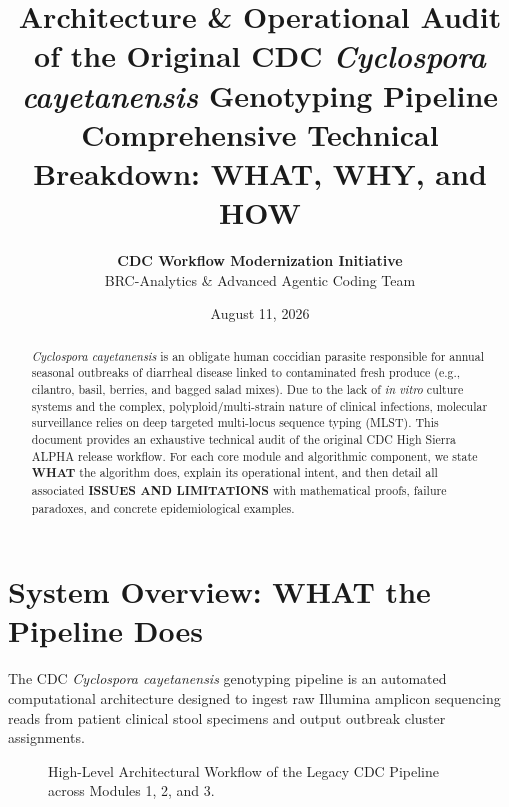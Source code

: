 \documentclass[11pt,a4paper]{article}
\title{\vspace{-1.5cm}\Huge \textbf{\color{CDCBlue} Architecture \& Operational Audit of the Original CDC \textit{Cyclospora cayetanensis} Genotyping Pipeline}\\[0.4em]
\Large \textbf{\color{SlateBlue} Comprehensive Technical Breakdown: WHAT, WHY, and HOW}}
\author{\textbf{CDC Workflow Modernization Initiative} \\ BRC-Analytics \& Advanced Agentic Coding Team}
\date{August 11, 2026}
\begin{document}
\maketitle

\begin{abstract}
\noindent \textit{Cyclospora cayetanensis} is an obligate human coccidian parasite responsible for annual seasonal outbreaks of diarrheal disease linked to contaminated fresh produce (e.g., cilantro, basil, berries, and bagged salad mixes). Due to the lack of \textit{in vitro} culture systems and the complex, polyploid/multi-strain nature of clinical infections, molecular surveillance relies on deep targeted multi-locus sequence typing (MLST). This document provides an exhaustive technical audit of the original CDC High Sierra ALPHA release workflow. For each core module and algorithmic component, we state \textbf{WHAT} the algorithm does, explain its operational intent, and then detail all associated \textbf{ISSUES AND LIMITATIONS} with mathematical proofs, failure paradoxes, and concrete epidemiological examples.
\end{abstract}

\section{System Overview: WHAT the Pipeline Does}

The CDC \textit{Cyclospora cayetanensis} genotyping pipeline is an automated computational architecture designed to ingest raw Illumina amplicon sequencing reads from patient clinical stool specimens and output outbreak cluster assignments.

\begin{figure}[h]
\centering
{}
\caption{High-Level Architectural Workflow of the Legacy CDC Pipeline across Modules 1, 2, and 3.}
\label{fig:arch}
\end{figure}
\end{document}
